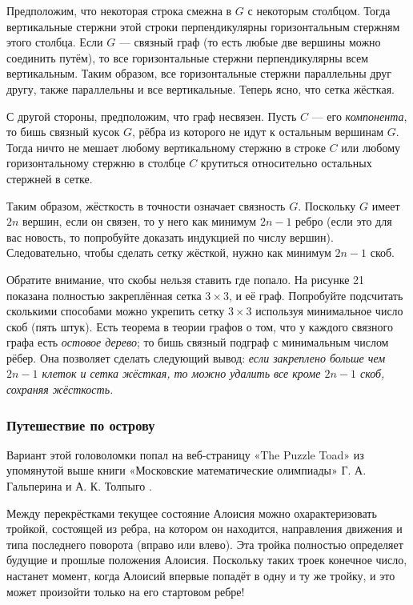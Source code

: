 Предположим, что некоторая строка смежна в $G$ с некоторым столбцом.
Тогда вертикальные стержни этой строки перпендикулярны горизонтальным стержням этого столбца.
Если $G$ --- связный граф (то есть любые две вершины можно соединить путём), то все горизонтальные стержни перпендикулярны всем вертикальным.
Таким образом, все горизонтальные стержни параллельны друг другу,
также параллельны и все вертикальные.
Теперь ясно, что сетка жёсткая.

С другой стороны, предположим, что граф несвязен.
Пусть $C$ --- его \emph{компонента}, то бишь связный кусок $G$, рёбра из которого не идут к остальным вершинам $G$.
Тогда ничто не мешает любому вертикальному стержню в строке $C$ или любому горизонтальному стержню в столбце $C$ крутиться относительно остальных стержней в сетке.

Таким образом, жёсткость в точности означает связность $G$.
Поскольку $G$ имеет $2n$ вершин, если он связен, то у него как минимум $2n - 1$ ребро
(если это для вас новость, то попробуйте доказать индукцией по числу вершин).
Следовательно, чтобы сделать сетку жёсткой, нужно как минимум $2n - 1$ скоб.

Обратите внимание, что скобы нельзя ставить где попало.
На рисунке 21 показана полностью закреплённая сетка $3 \times 3$, и её граф.
Попробуйте подсчитать сколькими способами можно укрепить сетку $3 \times 3$ используя минимальное число скоб  (пять штук).
Есть теорема в теории графов о том, что у каждого связного графа есть \emph{остовое дерево}; то бишь связный подграф с минимальным числом рёбер.
Она позволяет сделать следующий вывод: \emph{если закреплено больше чем $2n - 1$ клеток и сетка жёсткая, то можно удалить все кроме $2n - 1$ скоб, сохраняя жёсткость.}

\subsubsection*{Путешествие по острову}

Вариант этой головоломки попал на веб-страницу «The Puzzle Toad» \cite{bohman-pikhurko-frieze-sleator} из упомянутой выше книги «Московские математические олимпиады» Г. А. Гальперина и А. К. Толпыго \cite{23}.

Между перекрёстками текущее состояние Алоисия можно охарактеризовать тройкой, состоящей из ребра, на котором он находится, направления движения и типа последнего поворота (вправо или влево).
Эта тройка полностью определяет будущие и прошлые положения Алоисия.
Поскольку таких троек конечное число, настанет момент, когда Алоисий впервые попадёт в одну и ту же тройку, и это может произойти только на его стартовом ребре!


